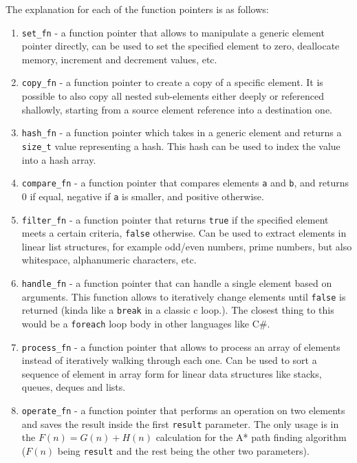 The explanation for each of the function pointers is as follows:
\begin{enumerate}
    \item \texttt{set\_fn} - a function pointer that allows to manipulate a generic element pointer directly, can be used to set the specified element to zero, deallocate memory, increment and decrement values, etc.
    \item \texttt{copy\_fn} - a function pointer to create a copy of a specific element. It is possible to also copy all nested sub-elements either deeply or referenced shallowly, starting from a source element reference into a destination one.
    \item \texttt{hash\_fn} - a function pointer which takes in a generic element and returns a \texttt{size\_t} value representing a hash. This hash can be used to index the value into a hash array.
    \item \texttt{compare\_fn} - a function pointer that compares elements \texttt{a} and \texttt{b}, and returns 0 if equal, negative if \texttt{a} is smaller, and positive otherwise.
    \item \texttt{filter\_fn} - a function pointer that returns \texttt{true} if the specified element meets a certain criteria, \texttt{false} otherwise. Can be used to extract elements in linear list structures, for example odd/even numbers, prime numbers, but also whitespace, alphanumeric characters, etc.
    \item \texttt{handle\_fn} - a function pointer that can handle a single element based on arguments. This function allows to iteratively change elements until \texttt{false} is returned (kinda like a \texttt{break} in a classic c loop.). The closest thing to this would be a \texttt{foreach} loop body in other languages like C\#.
    \item \texttt{process\_fn} - a function pointer that allows to process an array of elements instead of iteratively walking through each one. Can be used to sort a sequence of element in array form for linear data structures like stacks, queues, deques and lists.
    \item \texttt{operate\_fn} - a function pointer that performs an operation on two elements and saves the result inside the first \texttt{result} parameter. The only usage is in the \(F(n) = G(n) + H(n)\) calculation for the A* path finding algorithm (\(F(n)\) being \texttt{result} and the rest being the other two parameters).
\end{enumerate}

